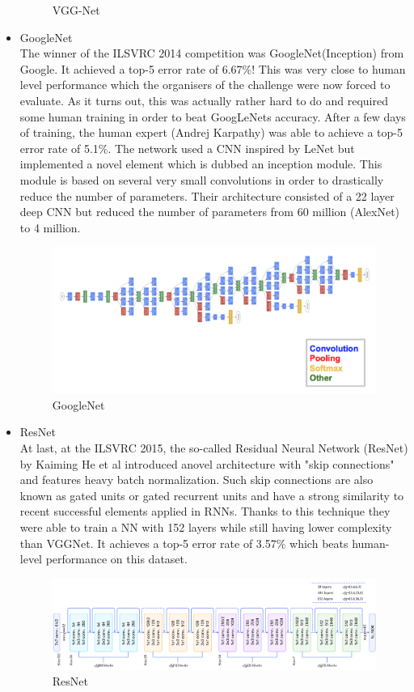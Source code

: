 \documentclass[paper=a4, fontsize=11pt]{scrartcl} %
\numberwithin{equation}{section} %
\numberwithin{figure}{section} %
\numberwithin{table}{section} %
\begin{document}
\begin{itemize}
\begin{figure}[H]
 		\caption{VGG-Net}
 		\label{fig:vggnet}
 	\end{figure}
  \item GoogleNet
  	\\ The winner of the ILSVRC 2014 competition was GoogleNet(Inception) from Google. It achieved a top-5 error rate of 6.67\%! This was very close to human level performance which the organisers of the challenge were now forced to evaluate. As it turns out, this was actually rather hard to do and required some human training in order to beat GoogLeNets accuracy. After a few days of training, the human expert (Andrej Karpathy) was able to achieve a top-5 error rate of 5.1\%. The network used a CNN inspired by LeNet but implemented a novel element which is dubbed an inception module. This module is based on several very small convolutions in order to drastically reduce the number of parameters. Their architecture consisted of a 22 layer deep CNN but reduced the number of parameters from 60 million (AlexNet) to 4 million.
	\begin{figure}[H]
 		\centering
 		\includegraphics[scale=0.25]{./googlenet.png}
 		\caption{GoogleNet}
 		\label{fig:googlenet}
 	\end{figure}
  \item ResNet
  	\\ At last, at the ILSVRC 2015, the so-called Residual Neural Network (ResNet) by Kaiming He et al introduced anovel architecture with "skip connections" and features heavy batch normalization. Such skip connections are also known as gated units or gated recurrent units and have a strong similarity to recent successful elements applied in RNNs. Thanks to this technique they were able to train a NN with 152 layers while still having lower complexity than VGGNet. It achieves a top-5 error rate of 3.57\% which beats human-level performance on this dataset.
	\begin{figure}[H]
 		\centering
 		\includegraphics[scale=0.25]{./resnet.png}
 		\caption{ResNet}
 		\label{fig:resnet}
 	\end{figure}
\end{itemize}
\end{document}
